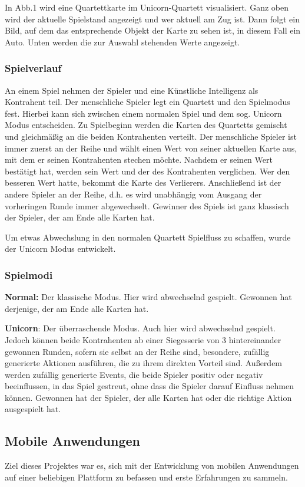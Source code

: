 \documentclass{scrartcl}
\begin{document}
In Abb.1 wird eine Quartettkarte im Unicorn-Quartett visualisiert.
Ganz oben wird der aktuelle Spielstand angezeigt und wer aktuell am Zug ist.
Dann folgt ein Bild, auf dem das entsprechende Objekt der Karte zu sehen ist, in diesem Fall ein Auto.
Unten werden die zur Auswahl stehenden Werte angezeigt.


\subsubsection{Spielverlauf}
An einem Spiel nehmen der Spieler und eine Künstliche Intelligenz als Kontrahent teil.
Der menschliche Spieler legt ein Quartett und den Spielmodus fest.
Hierbei kann sich zwischen einem normalen Spiel und dem sog. Unicorn Modus entscheiden.
Zu Spielbeginn werden die Karten des Quartetts gemischt und gleichmäßig an die beiden Kontrahenten verteilt.
Der menschliche Spieler ist immer zuerst an der Reihe und wählt einen Wert von seiner aktuellen Karte aus, mit dem er seinen Kontrahenten stechen möchte.
Nachdem er seinen Wert bestätigt hat, werden sein Wert und der des Kontrahenten verglichen. Wer den besseren Wert hatte, bekommt die Karte des Verlierers.
Anschließend ist der andere Spieler an der Reihe, d.h. es wird unabhängig vom Ausgang der vorheringen Runde immer abgewechselt.
Gewinner des Spiels ist ganz klassisch der Spieler, der am Ende alle Karten hat.

Um etwas Abwechslung in den normalen Quartett Spielfluss zu schaffen, wurde der Unicorn Modus entwickelt.

\subsubsection{Spielmodi}

\textbf{Normal:}
Der klassische Modus. Hier wird abwechselnd gespielt. Gewonnen hat derjenige, der am Ende alle Karten hat.

\textbf{Unicorn}:
Der überraschende Modus. Auch hier wird abwechselnd gespielt. Jedoch können beide Kontrahenten ab einer Siegesserie von 3 hintereinander gewonnen Runden, sofern sie selbst
an der Reihe sind, besondere, zufällig generierte Aktionen ausführen, die zu ihrem direkten Vorteil sind.
Außerdem werden zufällig generierte Events, die beide Spieler positiv oder negativ beeinflussen, in das Spiel gestreut, ohne dass die Spieler darauf Einfluss nehmen können.
Gewonnen hat der Spieler, der alle Karten hat oder die richtige Aktion ausgespielt hat.


\subsection{Mobile Anwendungen}
Ziel dieses Projektes war es, sich mit der Entwicklung von mobilen Anwendungen auf einer beliebigen Plattform zu befassen und erste Erfahrungen zu sammeln.
\end{document}
